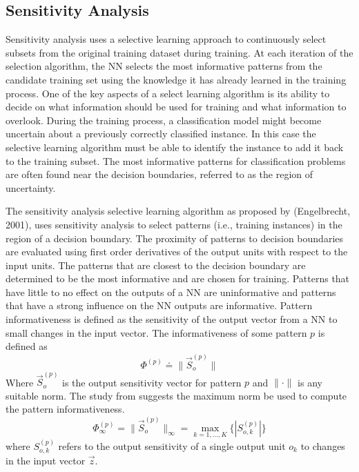 \documentclass[conference]{IEEEtran}
\begin{document}
	\subsection{Sensitivity Analysis}
	Sensitivity analysis uses a selective learning approach to continuously select subsets from the original training dataset during training. At each iteration of the selection algorithm, the NN selects the most informative patterns from the candidate training set using the knowledge it has already learned in the training process. One of the key aspects of a select learning algorithm is its ability to decide on what information should be used for training and what information to overlook. During the training process, a classification model might become uncertain about a previously correctly classified instance. In this case the selective learning algorithm must be able to identify the instance to add it back to the training subset. The most informative patterns for classification problems are often found near the decision boundaries, referred to as the region of uncertainty.
	
	The sensitivity analysis selective learning algorithm as proposed by (Engelbrecht, 2001), uses sensitivity analysis to select patterns (i.e., training instances) in the region of a decision boundary. The proximity of patterns to decision boundaries are evaluated using first order derivatives of the output units with respect to the input units. The patterns that are closest to the decision boundary are determined to be the most informative and are chosen for training. Patterns that have little to no effect on the outputs of a NN are uninformative and patterns that have a strong influence on the NN outputs are informative. Pattern informativeness is defined as the sensitivity of the output vector from a NN to small changes in the input vector. The informativeness of some pattern $p$ is defined as
	$$
	\Phi^{(p)} \doteq \lVert\vec{S}_o^{(p)}\lVert
	$$
	 Where $\vec{S}_o^{(p)}$ is the output sensitivity vector for pattern $p$ and $\lVert\cdot\lVert$ is any suitable norm. 
	The study from \cite{engelbrecht2001} suggests the maximum norm be used to compute the pattern informativeness.
	$$
	\Phi_\infty^{(p)} = \lVert\vec{S}_o^{(p)}\lVert_\infty = \max_{k=1,...,K}\{|S_{o,k}^{(p)}|\}
	$$
	where $S_{o,k}^{(p)}$ refers to the output sensitivity of a single output unit $o_k$ to changes in the input vector $\vec{z}$.
	
\end{document}
